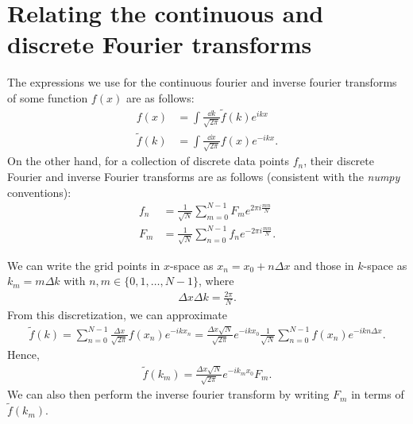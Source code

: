 \section{Relating the continuous and discrete Fourier transforms}
\label{app:relating-the-continuous-and-discrete-fourier-transforms}

The expressions we use for the continuous fourier and inverse fourier transforms of some function $f(x)$ are as follows:
\begin{align}
    f(x) &= \int \frac{\dd{k}}{\sqrt{2 \pi}} \tilde{f}(k) e^{i k x} \\
    \tilde{f}(k) &= \int \frac{\dd{x}}{\sqrt{2 \pi}} f(x) e^{-ikx}
.\end{align}
On the other hand, for a collection of discrete data points $f_{n}$, their discrete Fourier and inverse Fourier transforms are as follows (consistent with the \textit{numpy} conventions):
\begin{align}
    f_{n} &= \frac{1}{\sqrt{N}} \sum_{m=0}^{N-1} F_{m} e^{2 \pi i \frac{m n}{N}} \\
    F_{m} &= \frac{1}{\sqrt{N}} \sum_{n=0}^{N-1} f_{n} e^{-2 \pi i \frac{m n}{N}}
.\end{align}

We can write the grid points in $x$-space as $x_{n} = x_0 + n \Delta x$ and those in $k$-space as $k_{m} = m \Delta k$ with $n,m \in \{ 0,1,\ldots,N-1 \}$, where
\begin{align}
    \Delta x \Delta k = \frac{2 \pi}{N}
.\end{align}
From this discretization, we can approximate
\begin{align}
    \tilde{f}(k) = \sum_{n=0}^{N-1} \frac{\Delta x}{\sqrt{2 \pi}} f(x_{n}) e^{-i k x_{n}} = \frac{\Delta x \sqrt{N}}{\sqrt{2 \pi}} e^{-i k x_0} \frac{1}{\sqrt{N}} \sum_{n=0}^{N-1} f(x_{n}) e^{-i k n \Delta x}
.\end{align}
Hence,
\begin{align}
    \tilde{f}(k_{m}) = \frac{\Delta x \sqrt{N}}{\sqrt{2 \pi}} e^{-i k_{m} x_0} F_{m}
.\end{align}
We can also then perform the inverse fourier transform by writing $F_{m}$ in terms of $\tilde{f}(k_{m})$.


    

